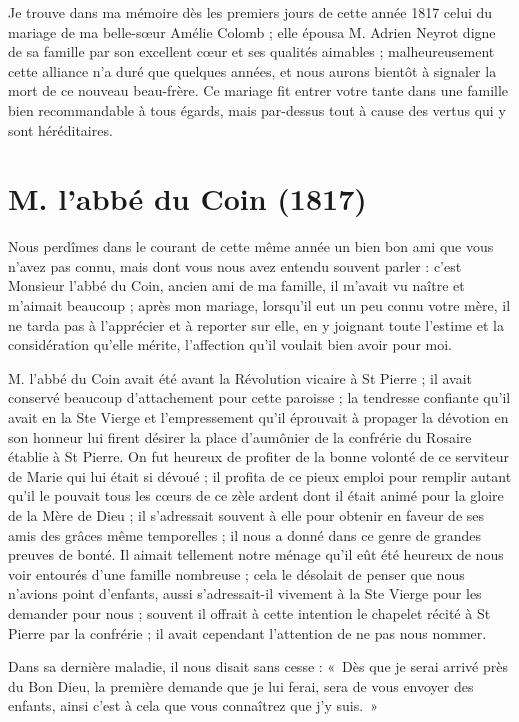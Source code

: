 \documentclass[11pt,a4paper]{report}
\begin{document}
Je trouve dans ma mémoire dès les premiers jours de cette année 1817 celui du mariage de ma belle-sœur Amélie Colomb ; elle épousa M. Adrien Neyrot digne de sa famille par son excellent cœur et ses qualités aimables ; malheureusement cette alliance n'a duré que quelques années, et nous aurons bientôt à signaler la mort de ce nouveau beau-frère. Ce mariage fit entrer votre tante dans une famille bien recommandable à tous égards, mais par-dessus tout à cause des vertus qui y sont héréditaires.

\section*{M. l'abbé du Coin (1817)}

Nous perdîmes dans le courant de cette même année un bien bon ami que vous n'avez pas connu, mais dont vous nous avez entendu souvent parler : c'est Monsieur l'abbé du Coin, ancien ami de ma famille, il m'avait vu naître et m'aimait beaucoup ; après mon mariage, lorsqu'il eut un peu connu votre mère, il ne tarda pas à l'apprécier et à reporter sur elle, en y joignant toute l'estime et la considération qu'elle mérite, l'affection qu'il voulait bien avoir pour moi.

M. l'abbé du Coin avait été avant la Révolution vicaire à St Pierre ; il avait conservé beaucoup d'attachement pour cette paroisse ; la tendresse confiante qu'il avait en la Ste Vierge et l'empressement qu'il éprouvait à propager la dévotion en son honneur lui firent désirer la place d'aumônier de la confrérie du Rosaire établie à St Pierre. On fut heureux de profiter de la bonne volonté de ce serviteur de Marie qui lui était si dévoué ; il profita de ce pieux emploi pour remplir autant qu'il le pouvait tous les cœurs de ce zèle ardent dont il était animé pour la gloire de la Mère de Dieu ; il s'adressait souvent à elle pour obtenir en faveur de ses amis des grâces même temporelles ; il nous a donné dans ce genre de grandes preuves de bonté. Il aimait tellement notre ménage qu'il eût été heureux de nous voir entourés d'une famille nombreuse ; cela le désolait de penser que nous n'avions point d'enfants, aussi s'adressait-il vivement à la Ste Vierge pour les demander pour nous ; souvent il offrait à cette intention le chapelet récité à St Pierre par la confrérie ; il avait cependant l'attention de ne pas nous nommer.

Dans sa dernière maladie, il nous disait sans cesse : «~Dès que je serai arrivé près du Bon Dieu, la première demande que je lui ferai, sera de vous envoyer des enfants, ainsi c'est à cela que vous connaîtrez que j'y suis.~»
\end{document}

